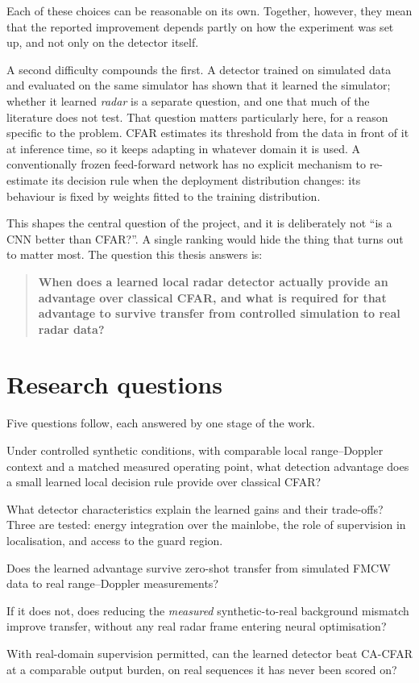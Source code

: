 Each of these choices can be reasonable on its own. Together, however, they mean that the reported
improvement depends partly on how the experiment was set up, and not only on the detector itself.

A second difficulty compounds the first. A detector trained on simulated data and evaluated on the
same simulator has shown that it learned the simulator; whether it learned \emph{radar} is a
separate question, and one that much of the literature does not test. That question matters
particularly here, for a reason specific to the problem. CFAR estimates its threshold from the data
in front of it at inference time, so it keeps adapting in whatever domain it is used. A
conventionally frozen feed-forward network has no explicit mechanism to re-estimate its decision
rule when the deployment distribution changes: its behaviour is fixed by weights fitted to the
training distribution.

This shapes the central question of the project, and it is deliberately not ``is a CNN better than
CFAR?''. A single ranking would hide the thing that turns out to matter most. The question this
thesis answers is:

\begin{quote}
\textbf{When does a learned local radar detector actually provide an advantage over classical CFAR,
and what is required for that advantage to survive transfer from controlled simulation to real radar
data?}
\end{quote}

\section{Research questions}
\label{sec:rqs}

Five questions follow, each answered by one stage of the work.

\begin{description}
\itemsep4pt
\item[RQ1 --- The controlled comparison.] Under controlled synthetic conditions, with comparable
local range--Doppler context and a matched measured operating point, what detection advantage does a
small learned local decision rule provide over classical CFAR?
\item[RQ2 --- The mechanism.] What detector characteristics explain the learned gains and their
trade-offs? Three are tested: energy integration over the mainlobe, the role of supervision in
localisation, and access to the guard region.
\item[RQ3 --- Transfer.] Does the learned advantage survive zero-shot transfer from simulated FMCW
data to real range--Doppler measurements?
\item[RQ4 --- The training domain.] If it does not, does reducing the \emph{measured}
synthetic-to-real background mismatch improve transfer, without any real radar frame entering neural
optimisation?
\item[RQ5 --- Real adaptation.] With real-domain supervision permitted, can the learned detector
beat CA-CFAR at a comparable output burden, on real sequences it has never been scored on?
\end{description}

